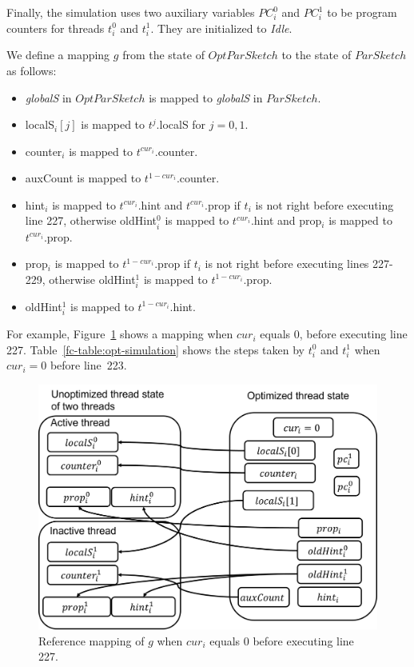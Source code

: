 Finally, the simulation uses two auxiliary variables $PC_i^0$ and $PC_i^1$ to be
program counters for threads $t_i^0$ and $t_i^1$. They are initialized to \emph{Idle}.

We define a mapping $g$ from the state of $OptParSketch$ to the state of $ParSketch$ as follows:
\begin{itemize}
    \item \emph{globalS} in $OptParSketch$ is mapped to \emph{globalS} in $ParSketch$.
    \item localS$_i[j]$ is mapped to $t^j$.localS for $j=0,1$.
    \item counter$_i$ is mapped to $t^{cur_i}$.counter.
    \item auxCount is mapped to $t^{1-cur_i}$.counter.
    \item hint$_i$ is mapped to $t^{cur_i}$.hint and $t^{cur_i}$.prop if $t_i$ is not right before executing line 227,
    otherwise oldHint$_i^0$ is mapped to $t^{cur_i}$.hint and prop$_i$ is mapped to $t^{cur_i}$.prop.
    \item prop$_i$ is mapped to $t^{1-cur_i}$.prop if $t_i$ is not right before executing lines 227-229,
    otherwise oldHint$_i^1$ is mapped to $t^{1-cur_i}$.prop.
    \item oldHint$_i^1$ is mapped to $t^{1-cur_i}$.hint.
\end{itemize}

For example, Figure~\ref{fc-fig:optConcurrentMap} shows a mapping when $cur_i$ equals 0, before executing
line 227. Table~\ref{fc-table:opt-simulation} shows the steps taken by $t_i^0$ and $t_i^1$ when
$cur_i=0$ before line~223.

\begin{figure}[ht]
    \centering
    \includegraphics[width=5in]{graphics/fast-concurrent/optConcurrentMap.png}
    \caption{Reference mapping of $g$ when $cur_i$ equals 0 before executing line 227.}
    \label{fc-fig:optConcurrentMap}
\end{figure}

